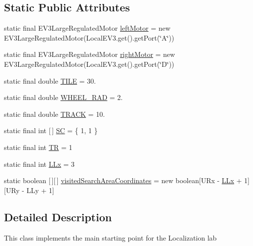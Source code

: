 \subsection*{Static Public Attributes}
\begin{DoxyCompactItemize}
\item 
static final E\+V3\+Large\+Regulated\+Motor \hyperlink{classca_1_1mcgill_1_1ecse211_1_1lab5_1_1_lab5_a613e69d8f1e90a1161b78020571110fc}{left\+Motor} = new E\+V3\+Large\+Regulated\+Motor(Local\+E\+V3.\+get().get\+Port(\char`\"{}A\char`\"{}))
\item 
static final E\+V3\+Large\+Regulated\+Motor \hyperlink{classca_1_1mcgill_1_1ecse211_1_1lab5_1_1_lab5_a70575e1c6e84cd9d22cadd141ad6ceae}{right\+Motor} = new E\+V3\+Large\+Regulated\+Motor(Local\+E\+V3.\+get().get\+Port(\char`\"{}D\char`\"{}))
\item 
static final double \hyperlink{classca_1_1mcgill_1_1ecse211_1_1lab5_1_1_lab5_a099ba21be1cd8d54a57c40cd0d35701d}{T\+I\+LE} = 30.
\item 
static final double \hyperlink{classca_1_1mcgill_1_1ecse211_1_1lab5_1_1_lab5_ab9b6fc96d3fb1ac6c7d69d1727b3bbdd}{W\+H\+E\+E\+L\+\_\+\+R\+AD} = 2.
\item 
static final double \hyperlink{classca_1_1mcgill_1_1ecse211_1_1lab5_1_1_lab5_a3d2e7eb578ce6ef7f7453feed3835e1d}{T\+R\+A\+CK} = 10.
\item 
static final int \mbox{[}$\,$\mbox{]} \hyperlink{classca_1_1mcgill_1_1ecse211_1_1lab5_1_1_lab5_a39cbd32759fdb575b92b694f2713085d}{SC} = \{ 1, 1 \}
\item 
static final int \hyperlink{classca_1_1mcgill_1_1ecse211_1_1lab5_1_1_lab5_a0dd5ea6f697d2221ed8c8bb4df1cac7f}{TR} = 1
\item 
static final int \hyperlink{classca_1_1mcgill_1_1ecse211_1_1lab5_1_1_lab5_a957a526ed669e9d8b7fc485e21385ee9}{L\+Lx} = 3
\item 
static boolean \mbox{[}$\,$\mbox{]}\mbox{[}$\,$\mbox{]} \hyperlink{classca_1_1mcgill_1_1ecse211_1_1lab5_1_1_lab5_a27ae00bb6fbeed54573af9cc5c3dc32e}{visited\+Search\+Area\+Coordinates} = new boolean\mbox{[}U\+Rx -\/ \hyperlink{classca_1_1mcgill_1_1ecse211_1_1lab5_1_1_lab5_a957a526ed669e9d8b7fc485e21385ee9}{L\+Lx} + 1\mbox{]}\mbox{[}U\+Ry -\/ L\+Ly + 1\mbox{]}
\end{DoxyCompactItemize}


\subsection{Detailed Description}
This class implements the main starting point for the Localization lab

